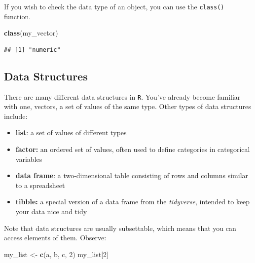 \documentclass[
]{book}
\newenvironment{Shaded}{\begin{snugshade}}{\end{snugshade}}
\newcommand{\DecValTok}[1]{\textcolor[rgb]{0.00,0.00,0.81}{#1}}
\newcommand{\FunctionTok}[1]{\textcolor[rgb]{0.13,0.29,0.53}{\textbf{#1}}}
\newcommand{\NormalTok}[1]{#1}
\newcommand{\OtherTok}[1]{\textcolor[rgb]{0.56,0.35,0.01}{#1}}
\newcommand{\StringTok}[1]{\textcolor[rgb]{0.31,0.60,0.02}{#1}}
\providecommand{\tightlist}{%
  \setlength{\itemsep}{0pt}\setlength{\parskip}{0pt}}
\begin{document}
If you wish to check the data type of an object, you can use the \texttt{class()} function.

\begin{Shaded}
\begin{Highlighting}[]
\FunctionTok{class}\NormalTok{(my\_vector)}
\end{Highlighting}
\end{Shaded}

\begin{verbatim}
## [1] "numeric"
\end{verbatim}

\hypertarget{data-structures}{%
\subsection{Data Structures}\label{data-structures}}

There are many different data structures in \texttt{R}. You've already become familiar with one, vectors, a set of values of the same type. Other types of data structures include:

\begin{itemize}
\tightlist
\item
  \textbf{list}: a set of values of different types
\item
  \textbf{factor:} an ordered set of values, often used to define categories in categorical variables
\item
  \textbf{data frame}: a two-dimensional table consisting of rows and columns similar to a spreadsheet
\item
  \textbf{tibble:} a special version of a data frame from the \emph{tidyverse}, intended to keep your data nice and tidy
\end{itemize}

Note that data structures are usually subsettable, which means that you can access elements of them. Observe:

\begin{Shaded}
\begin{Highlighting}[]
\NormalTok{my\_list }\OtherTok{\textless{}{-}} \FunctionTok{c}\NormalTok{(}\StringTok{\textquotesingle{}a\textquotesingle{}}\NormalTok{, }\StringTok{\textquotesingle{}b\textquotesingle{}}\NormalTok{, }\StringTok{\textquotesingle{}c\textquotesingle{}}\NormalTok{, }\DecValTok{2}\NormalTok{)}
\NormalTok{my\_list[}\DecValTok{2}\NormalTok{]}
\end{Highlighting}
\end{Shaded}
\end{document}

